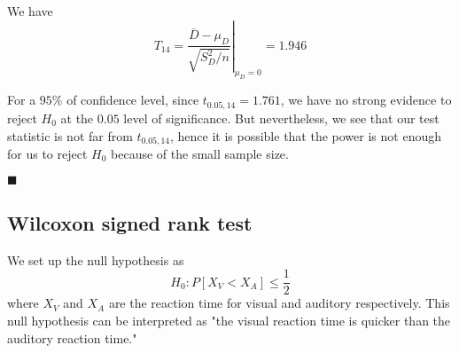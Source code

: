 \documentclass[13pt]{article}
\newcommand{\myqed}{\hfill$\blacksquare$}
\newcommand{\at}[3]{\left.#1\right\vert_{#2}^{#3}}
\begin{document}
\par We have
\begin{equation*}
    T_{14} = \at{\frac{\overline{D} - \mu_D}{\sqrt{S_D^2/n}}}{\mu_D = 0}{} = 1.946
\end{equation*}

\par For a $95\%$ of confidence level, since $t_{0.05, 14} = 1.761$, we have no strong evidence to reject $H_0$ at the $0.05$ level 
of significance. But nevertheless, we see that our test statistic is not far from $t_{0.05, 14}$, hence it is possible that the power is 
not enough for us to reject $H_0$ because of the small sample size.
 
\myqed

\newpage
\subsection*{Wilcoxon signed rank test}
\par We set up the null hypothesis as 
\begin{equation*}
    H_0 : P[X_{V} < X_{A}] \leq \frac{1}{2}
\end{equation*}
where $X_V$ and $X_A$ are the reaction time for visual and auditory respectively. This null hypothesis can be interpreted as 
"the visual reaction time is quicker than the auditory reaction time."
\end{document}
